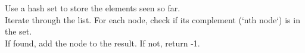 \documentclass[preview]{standalone}
\begin{document}
Use a hash set to store the elements seen so far.\\Iterate through the list. For each node, check if its complement (`nth node`) is in the set.\\If found, add the node to the result. If not, return -1.\\
\end{document}
